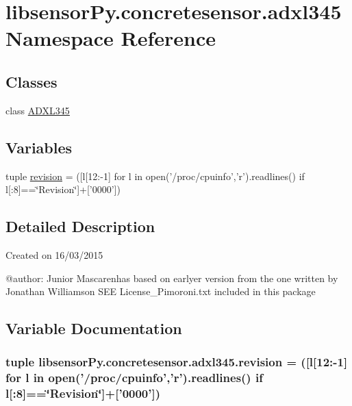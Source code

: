 \hypertarget{namespacelibsensorPy_1_1concretesensor_1_1adxl345}{}\section{libsensor\+Py.\+concretesensor.\+adxl345 Namespace Reference}
\label{namespacelibsensorPy_1_1concretesensor_1_1adxl345}
\subsection*{Classes}
\begin{DoxyCompactItemize}
\item 
class \hyperlink{classlibsensorPy_1_1concretesensor_1_1adxl345_1_1ADXL345}{A\+D\+X\+L345}
\end{DoxyCompactItemize}
\subsection*{Variables}
\begin{DoxyCompactItemize}
\item 
tuple \hyperlink{namespacelibsensorPy_1_1concretesensor_1_1adxl345_a0e40f96ec80d2012ab673ad28366e090}{revision} = (\mbox{[}l\mbox{[}12\+:-\/1\mbox{]} for l in open('/proc/cpuinfo','r').readlines() if l\mbox{[}\+:8\mbox{]}==\char`\"{}Revision\char`\"{}\mbox{]}+\mbox{[}'0000'\mbox{]})
\end{DoxyCompactItemize}


\subsection{Detailed Description}
\begin{DoxyVerb}Created on 16/03/2015

@author: Junior Mascarenhas
based on earlyer version from
the one written by Jonathan Williamson
SEE License_Pimoroni.txt included in this package
\end{DoxyVerb}
 

\subsection{Variable Documentation}
\hypertarget{namespacelibsensorPy_1_1concretesensor_1_1adxl345_a0e40f96ec80d2012ab673ad28366e090}{}
\subsubsection[{revision}]{\setlength{\rightskip}{0pt plus 5cm}tuple libsensor\+Py.\+concretesensor.\+adxl345.\+revision = (\mbox{[}l\mbox{[}12\+:-\/1\mbox{]} for l in open('/proc/cpuinfo','r').readlines() if l\mbox{[}\+:8\mbox{]}==\char`\"{}Revision\char`\"{}\mbox{]}+\mbox{[}'0000'\mbox{]})}\label{namespacelibsensorPy_1_1concretesensor_1_1adxl345_a0e40f96ec80d2012ab673ad28366e090}
